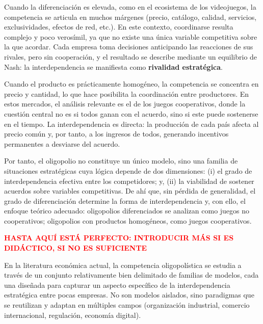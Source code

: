 \documentclass[10pt,a4paper]{article}
\begin{document}
Cuando la diferenciación es elevada, como en el ecosistema de los videojuegos, la competencia se articula en muchos márgenes (precio, catálogo, calidad, servicios, exclusividades, efectos de red, etc.). En este contexto, coordinarse resulta complejo y poco verosímil, ya que no existe una única variable competitiva sobre la que acordar. Cada empresa toma decisiones anticipando las reacciones de sus rivales, pero sin cooperación, y el resultado se describe mediante un equilibrio de Nash: la interdependencia se manifiesta como \textbf{rivalidad estratégica}.

Cuando el producto es prácticamente homogéneo, la competencia se concentra en precio y cantidad, lo que hace posibilita la coordinación entre productores. En estos mercados, el análisis relevante es el de los juegos cooperativos, donde la cuestión central no es si todos ganan con el acuerdo, sino si este puede sostenerse en el tiempo. La interdependencia es directa: la producción de cada país afecta al precio común y, por tanto, a los ingresos de todos, generando incentivos permanentes a desviarse del acuerdo.

Por tanto, el oligopolio no constituye un único modelo, sino una familia de situaciones estratégicas cuya lógica depende de dos dimensiones: (i) el grado de interdependencia efectiva entre los competidores; y, (ii) la viabilidad de sostener acuerdos sobre variables competitivas. De ahí que, sin pérdida de generalidad, el grado de diferenciación determine la forma de interdependencia y, con ello, el enfoque teórico adecuado: oligopolios diferenciados se analizan como juegos no cooperativos; oligopolios con productos homogéneos, como juegos cooperativos.



\textcolor{red}{\textbf{HASTA AQUÍ ESTÁ PERFECTO: INTRODUCIR MÁS SI ES DIDÁCTICO, SI NO ES SUFICIENTE}}





En la literatura económica actual, la competencia oligopolística se estudia a través de un conjunto relativamente bien delimitado de familias de modelos, cada una diseñada para capturar un aspecto específico de la interdependencia estratégica entre pocas empresas. No son modelos aislados, sino paradigmas que se reutilizan y adaptan en múltiples campos (organización industrial, comercio internacional, regulación, economía digital).
\end{document}
